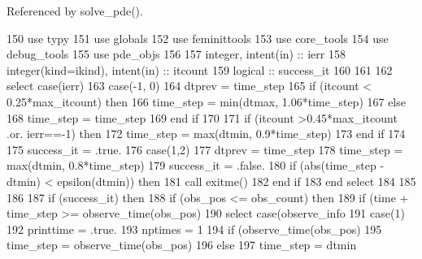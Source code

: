 Referenced by solve\+\_\+pde().


\begin{DoxyCode}
150       \textcolor{keywordtype}{use }typy
151       \textcolor{keywordtype}{use }globals
152       \textcolor{keywordtype}{use }feminittools
153       \textcolor{keywordtype}{use }core_tools
154       \textcolor{keywordtype}{use }debug_tools
155       \textcolor{keywordtype}{use }pde_objs
156       
157       \textcolor{keywordtype}{integer}, \textcolor{keywordtype}{intent(in)} :: ierr
158       \textcolor{keywordtype}{integer(kind=ikind)}, \textcolor{keywordtype}{intent(in)} :: itcount
159       \textcolor{keywordtype}{logical} :: success\_it
160 
161 
162       \textcolor{keywordflow}{select case}(ierr)
163         \textcolor{keywordflow}{case}(-1, 0)
164           dtprev = time_step
165           \textcolor{keywordflow}{if} (itcount < 0.25*max_itcount) \textcolor{keywordflow}{then}
166             time_step = min(dtmax, 1.06*time_step) 
167           \textcolor{keywordflow}{else}
168             time_step = time_step
169 \textcolor{keywordflow}{          end if}
170           
171           \textcolor{keywordflow}{if} (itcount >0.45*max_itcount .or. ierr==-1) \textcolor{keywordflow}{then}
172             time_step = max(dtmin, 0.9*time_step)
173 \textcolor{keywordflow}{          end if}
174             
175           success\_it = .true.
176         \textcolor{keywordflow}{case}(1,2)
177           dtprev = time_step
178           time_step = max(dtmin, 0.8*time_step)
179           success\_it = .false.
180           \textcolor{keywordflow}{if} (abs(time_step - dtmin) < epsilon(dtmin)) \textcolor{keywordflow}{then}
181             \textcolor{keyword}{call }exitme()
182 \textcolor{keywordflow}{          end if}
183 \textcolor{keywordflow}{      end select}
184       
185   
186 
187       \textcolor{keywordflow}{if} (success\_it) \textcolor{keywordflow}{then}      
188         \textcolor{keywordflow}{if} (obs\_pos <= obs\_count) \textcolor{keywordflow}{then}
189           \textcolor{keywordflow}{if} (time + time_step >= observe_time(obs\_pos)%
190             \textcolor{keywordflow}{select case}(observe_info%
191               \textcolor{keywordflow}{case}(1)
192                 printtime = .true.
193                 nptimes = 1
194                 \textcolor{keywordflow}{if} (observe_time(obs\_pos)%
195                   time_step = observe_time(obs\_pos)%
196                 \textcolor{keywordflow}{else}
197                   time_step = dtmin

\end{DoxyCode}
